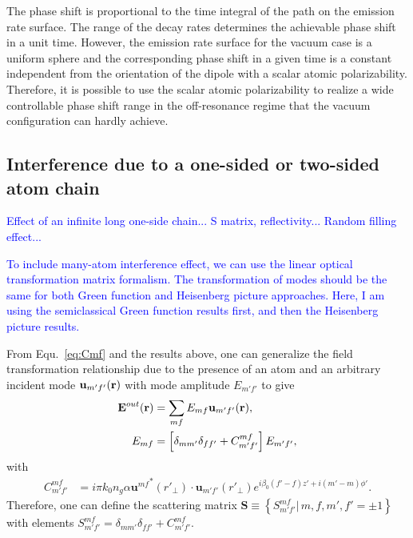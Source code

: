 \documentclass[preprint,aps,pra,onecolumn]{revtex4-1} %
\begin{document}

The phase shift is proportional to the time integral of the path on the emission rate surface. The range of the decay rates determines the achievable phase shift in a unit time. However, the emission rate surface for the vacuum case is a uniform sphere and the corresponding phase shift in a given time is a constant independent from the orientation of the dipole with a scalar atomic polarizability. Therefore, it is possible to use the scalar atomic polarizability to realize a wide controllable phase shift range in the off-resonance regime that the vacuum configuration can hardly achieve. 


\subsection{Interference due to a one-sided or two-sided atom chain}
\textcolor{blue}{Effect of an infinite long one-side chain... S matrix, reflectivity... Random filling effect...}

\textcolor{blue}{To include many-atom interference effect, we can use the linear optical transformation matrix formalism. The transformation of modes should be the same for both Green function and Heisenberg picture approaches. Here, I am using the semiclassical Green function results first, and then the Heisenberg picture results. } 


From Equ.~\ref{eq:Cmf} and the results above, one can generalize the field transformation relationship due to the presence of an atom and an arbitrary incident mode $\mathbf{u}_{m'f'}(\mathbf{r})$ with mode amplitude $E_{m'f'}$ to give
\begin{align}
\mathbf{E}^{out}(\mathbf{r}) &= \sum_{mf}E_{mf}\mathbf{u}_{m'f'}(\mathbf{r}),\\
E_{mf} &= \left[\delta_{mm'}\delta_{ff'}+C_{m'f'}^{mf}\right]E_{m'f'},
\end{align}
with 
\begin{align}
C^{mf}_{m'f'}
&= i\pi k_0 n_g\alpha  {\mathbf{u}^{mf}}^*(r'_{\!\perp})\cdot \mathbf{u}_{m'f'}(r'_{\!\perp})e^{i\beta_0 (f'-f)z'+i(m'-m)\phi'}.\label{eq:Cmfmf}
\end{align}
Therefore, one can define the scattering matrix $\mathbf{S}\equiv \left\{S^{mf}_{m'f'}|\,m,f,m',f'=\pm 1 \right\}$ with elements $S^{mf}_{m'f'}=\delta_{mm'}\delta_{ff'}+C_{m'f'}^{mf}$. 
\end{document}
